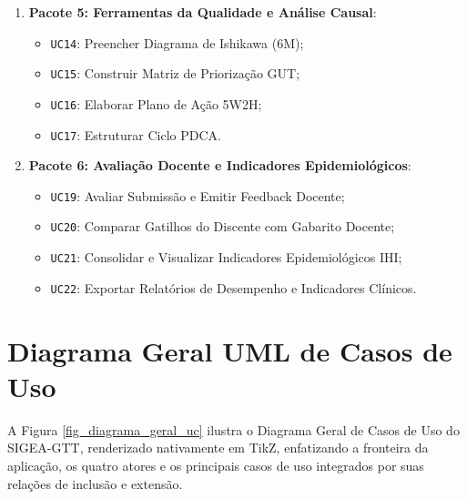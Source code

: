 \begin{enumerate}
    \item \textbf{Pacote 5: Ferramentas da Qualidade e Análise Causal}:
    \begin{itemize}
        \item \texttt{UC14}: Preencher Diagrama de Ishikawa (6M);
        \item \texttt{UC15}: Construir Matriz de Priorização GUT;
        \item \texttt{UC16}: Elaborar Plano de Ação 5W2H;
        \item \texttt{UC17}: Estruturar Ciclo PDCA.
    \end{itemize}

    \item \textbf{Pacote 6: Avaliação Docente e Indicadores Epidemiológicos}:
    \begin{itemize}
        \item \texttt{UC19}: Avaliar Submissão e Emitir Feedback Docente;
        \item \texttt{UC20}: Comparar Gatilhos do Discente com Gabarito Docente;
        \item \texttt{UC21}: Consolidar e Visualizar Indicadores Epidemiológicos IHI;
        \item \texttt{UC22}: Exportar Relatórios de Desempenho e Indicadores Clínicos.
    \end{itemize}
\end{enumerate}

\section{Diagrama Geral UML de Casos de Uso}
\label{sec_diagrama_geral_tikz}

A Figura \ref{fig_diagrama_geral_uc} ilustra o Diagrama Geral de Casos de Uso do SIGEA-GTT, renderizado nativamente em TikZ, enfatizando a fronteira da aplicação, os quatro atores e os principais casos de uso integrados por suas relações de inclusão e extensão.

